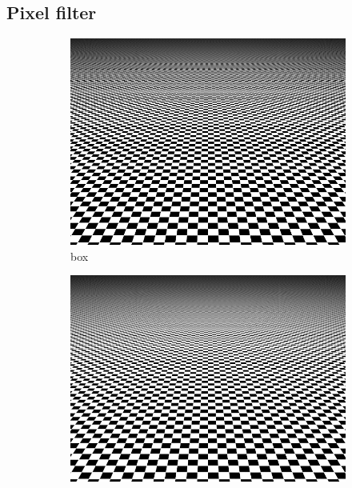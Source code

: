 \documentclass{article}
\begin{document}
\subsection{Pixel filter}
\label{sec:pixel_filter}

\begin{figure}
    \centering
    \begin{subfigure}[t]{0.32\linewidth}
        \centering
        \includegraphics[width=\textwidth]{imgs/box.png}
        \caption{box}
        \label{fig:box_filter}
    \end{subfigure}
    \begin{subfigure}[t]{0.32\linewidth}
        \centering
        \includegraphics[width=\textwidth]{imgs/tent.png}

\end{subfigure}
\end{figure}
\end{document}
